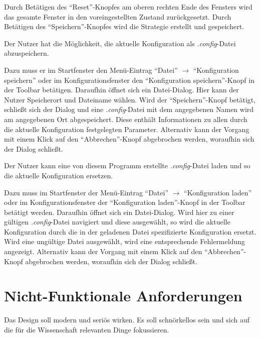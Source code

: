 \documentclass[parskip=full,11pt]{scrartcl}
\begin{document}
Durch Betätigen des \enquote{Reset}-Knopfes am oberen rechten Ende des Fensters wird das gesamte Fenster in den voreingestellten Zustand zurückgesetzt. Durch Betätigen des \enquote{Speichern}-Knopfes wird die Strategie erstellt und gespeichert.

Der Nutzer hat die Möglichkeit, die aktuelle Konfiguration als \textit{.config}-Datei abzuspeichern.

Dazu muss er im Startfenster den Menü-Eintrag \enquote{Datei} \(\rightarrow\) \enquote{Konfiguration speichern} oder im Konfigurationsfenster den \enquote{Konfiguration speichern}-Knopf in der Toolbar betätigen. Daraufhin öffnet sich ein Datei-Dialog. Hier kann der Nutzer Speicherort und Dateiname wählen. Wird der \enquote{Speichern}-Knopf betätigt, schließt sich der Dialog und eine \textit{.config}-Datei mit dem angegebenen Namen wird am angegebenen Ort abgespeichert. Diese enthält Informationen zu allen durch die aktuelle Konfiguration festgelegten Parameter. Alternativ kann der Vorgang mit einem Klick auf den \enquote{Abbrechen}-Knopf abgebrochen werden, woraufhin sich der Dialog schließt.

Der Nutzer kann eine von diesem Programm erstellte \textit{.config}-Datei laden und so die aktuelle Konfiguration ersetzen.

Dazu muss im Startfenster der Menü-Eintrag \enquote{Datei} \(\rightarrow\) \enquote{Konfiguration laden} oder im Konfigurationsfenster der \enquote{Konfiguration laden}-Knopf in der Toolbar betätigt werden. Daraufhin öffnet sich ein Datei-Dialog. Wird hier zu einer gültigen \textit{.config}-Datei navigiert und diese ausgewählt, so wird die aktuelle Konfiguration durch die in der geladenen Datei spezifizierte Konfiguration ersetzt. Wird eine ungültige Datei ausgewählt, wird eine entsprechende Fehlermeldung angezeigt. Alternativ kann der Vorgang mit einem Klick auf den \enquote{Abbrechen}-Knopf abgebrochen werden, woraufhin sich der Dialog schließt.

\section{Nicht-Funktionale Anforderungen}


Das Design soll modern und seriös wirken. Es soll schnörkellos sein und sich auf die für die Wissenschaft relevanten Dinge fokussieren.
\end{document}
